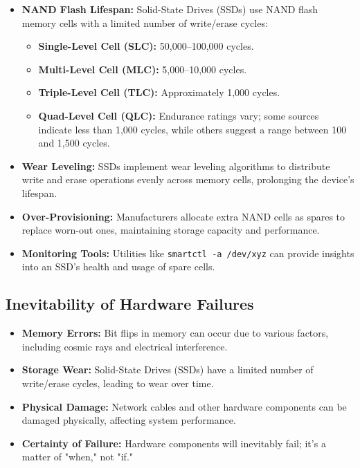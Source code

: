 \documentclass[../Main.tex]{subfiles}
\begin{document}
\begin{itemize}
    \item \textbf{NAND Flash Lifespan:} Solid-State Drives (SSDs) use NAND flash memory cells with a limited number of write/erase cycles:
    \begin{itemize}
        \item \textbf{Single-Level Cell (SLC):} 50,000–100,000 cycles.
        \item \textbf{Multi-Level Cell (MLC):} 5,000–10,000 cycles.
        \item \textbf{Triple-Level Cell (TLC):} Approximately 1,000 cycles.
        \item \textbf{Quad-Level Cell (QLC):} Endurance ratings vary; some sources indicate less than 1,000 cycles,
        while others suggest a range between 100 and 1,500 cycles. \cite{turn0search25}
    \end{itemize}
    \item \textbf{Wear Leveling:} SSDs implement wear leveling algorithms to distribute write and erase operations evenly across memory cells, prolonging the device's lifespan.
    \item \textbf{Over-Provisioning:} Manufacturers allocate extra NAND cells as spares to replace worn-out ones, maintaining storage capacity and performance.
    \item \textbf{Monitoring Tools:} Utilities like \texttt{smartctl -a /dev/xyz} can provide insights into an SSD's health and usage of spare cells.
\end{itemize}

\subsection{Inevitability of Hardware Failures}

\begin{itemize}
    \item \textbf{Memory Errors:} Bit flips in memory can occur due to various factors, including cosmic rays and electrical interference.
    \item \textbf{Storage Wear:} Solid-State Drives (SSDs) have a limited number of write/erase cycles, leading to wear over time.
    \item \textbf{Physical Damage:} Network cables and other hardware components can be damaged physically, affecting system performance.
    \item \textbf{Certainty of Failure:} Hardware components will inevitably fail; it's a matter of "when," not "if."
\end{itemize}
\end{document}
